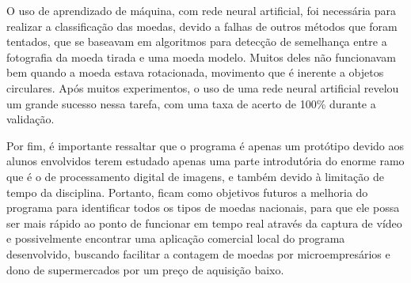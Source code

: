 \documentclass[10pt,journal,compsoc]{IEEEtran}
\begin{document}
O uso de aprendizado de máquina, com rede neural artificial, foi necessária para realizar a classificação das moedas, devido a falhas de outros métodos que foram tentados, que se baseavam em algoritmos para detecção de semelhança entre a fotografia da moeda tirada e uma moeda modelo. Muitos deles não funcionavam bem quando a moeda estava rotacionada, movimento que é inerente a objetos circulares.
Após muitos experimentos, o uso de uma rede neural artificial revelou um grande sucesso nessa tarefa, com uma taxa de acerto de 100\% durante a validação.

Por fim, é importante ressaltar que o programa é apenas um protótipo devido aos alunos envolvidos terem estudado apenas uma parte introdutória do enorme ramo que é o de processamento digital de imagens, e também devido à limitação de tempo da disciplina. Portanto, ficam como objetivos futuros a melhoria do programa para identificar todos os tipos de moedas nacionais, para que ele possa ser mais rápido ao ponto de funcionar em tempo real através da captura de vídeo e possivelmente encontrar uma aplicação comercial local do programa desenvolvido, buscando facilitar a contagem de moedas por microempresários e dono de supermercados por um preço de aquisição baixo.  

\medskip



\end{document}
